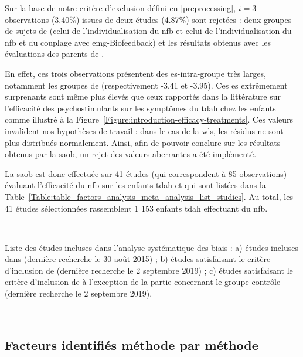 Sur la base de notre critère d'exclusion défini en \ref{preprocessing}, $i = 3$ observations (3.40\%) issues de deux études (4.87\%) sont rejetées : deux groupes de sujets de 
\citet{Bazanova2018} (celui de l'individualisation du \gls{nfb} et 
celui de l'individualisation du \gls{nfb} et du couplage avec \gls{emg}-Biofeedback) et les résultats obtenus avec les évaluations des 
parents de \citet{Rajabi2019}. 

En effet, ces trois observations présentent des \gls{es}-intra-groupe très larges, notamment les groupes de \citet{Bazanova2018} 
(respectivement -3.41 et -3.95). Ces \gls{es} extrêmement surprenants sont même plus élevés que ceux rapportés dans la littérature sur l'efficacité 
des psychostimulants sur les symptômes du \gls{tdah} chez les enfants \citep{Luan2017} comme illustré à la Figure~\ref{Figure:introduction-efficacy-treatments}. 
Ces valeurs invalident nos hypothèses de travail : dans le cas de la 
\gls{wls}, les résidus ne sont plus distribués normalement. Ainsi, afin de pouvoir conclure sur les résultats obtenus par la \gls{saob}, 
un rejet des valeurs aberrantes a été implémenté.

La \gls{saob} est donc effectuée sur 41 études (qui correspondent à 85 observations) évaluant l'efficacité du \gls{nfb} sur les enfants \gls{tdah} et 
qui sont listées dans la Table~\ref{Table:table_factors_analysis_meta_analysis_list_studies}. Au total, les 41 études sélectionnées rassemblent 
1 153 enfants \gls{tdah} effectuant du \gls{nfb}.

\newpage\
\begin{table}[h!]
  \centering
  \caption{Liste des études incluses dans l'analyse systématique des biais : a) études incluses dans \citet{Cortese2016}
	(dernière recherche le 30 août 2015) ; b) études satisfaisant le critère d'inclusion de \citet{Cortese2016} (dernière recherche le 2 septembre 2019) ; c) études 
	satisfaisant le critère d'inclusion de \citet{Cortese2016} à l'exception de la partie concernant le groupe contrôle (dernière recherche le 2 septembre 2019).}
  
  \label{Table:table_factors_analysis_meta_analysis_list_studies}
\end{table}

\newpage\
\subsection{Facteurs identifiés méthode par méthode}

